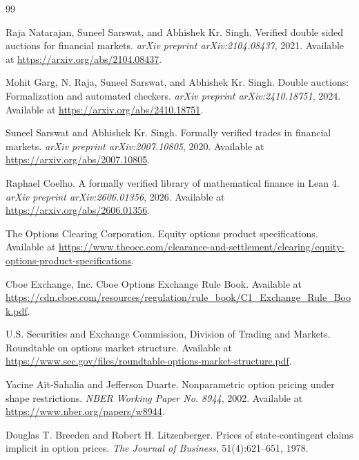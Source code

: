 \documentclass[11pt]{article}
\begin{document}
\begin{thebibliography}{99}
\raggedright

Raja Natarajan, Suneel Sarswat, and Abhishek Kr. Singh.
\newblock Verified double sided auctions for financial markets.
\newblock \emph{arXiv preprint arXiv:2104.08437}, 2021.
\newblock Available at \url{https://arxiv.org/abs/2104.08437}.

Mohit Garg, N. Raja, Suneel Sarswat, and Abhishek Kr. Singh.
\newblock Double auctions: Formalization and automated checkers.
\newblock \emph{arXiv preprint arXiv:2410.18751}, 2024.
\newblock Available at \url{https://arxiv.org/abs/2410.18751}.

Suneel Sarswat and Abhishek Kr. Singh.
\newblock Formally verified trades in financial markets.
\newblock \emph{arXiv preprint arXiv:2007.10805}, 2020.
\newblock Available at \url{https://arxiv.org/abs/2007.10805}.

Raphael Coelho.
\newblock A formally verified library of mathematical finance in Lean 4.
\newblock \emph{arXiv preprint arXiv:2606.01356}, 2026.
\newblock Available at \url{https://arxiv.org/abs/2606.01356}.

The Options Clearing Corporation.
\newblock Equity options product specifications.
\newblock Available at \url{https://www.theocc.com/clearance-and-settlement/clearing/equity-options-product-specifications}.

Cboe Exchange, Inc.
\newblock Cboe Options Exchange Rule Book.
\newblock Available at \url{https://cdn.cboe.com/resources/regulation/rule_book/C1_Exchange_Rule_Book.pdf}.

U.S. Securities and Exchange Commission, Division of Trading and Markets.
\newblock Roundtable on options market structure.
\newblock Available at \url{https://www.sec.gov/files/roundtable-options-market-structure.pdf}.

Yacine A{\"i}t-Sahalia and Jefferson Duarte.
\newblock Nonparametric option pricing under shape restrictions.
\newblock \emph{NBER Working Paper No. 8944}, 2002.
\newblock Available at \url{https://www.nber.org/papers/w8944}.

Douglas T. Breeden and Robert H. Litzenberger.
\newblock Prices of state-contingent claims implicit in option prices.
\newblock \emph{The Journal of Business}, 51(4):621--651, 1978.

\end{thebibliography}
\end{document}
